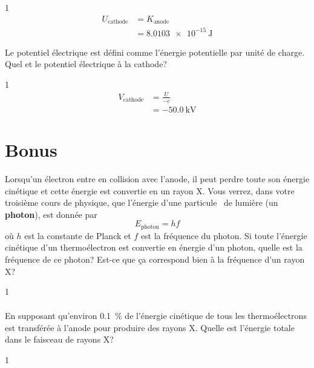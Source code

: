 \documentclass{tufte-handout}
\def\reponse{0}
\begin{document}
\if\reponse1
  {\color{tblue}
    \begin{align*}
      U_\mathrm{cathode} &= K_\mathrm{anode}  \\
        &= \SI{8.0103e-15}{\joule}
    \end{align*}
  }
\else
  \vspace{5cm}
\fi



Le potentiel électrique est défini comme l'énergie potentielle par unité de
charge. Quel et le potentiel électrique à la cathode?

\if\reponse1
  {\color{tblue}
    \begin{align*}
      V_\mathrm{cathode} &= \frac{U}{-e}  \\
        &= \SI{-50.0}{\kilo\volt}
    \end{align*}
  }
\else
  \vspace{5cm}
\fi


\section{Bonus}

\marginnote{
  \[h = \SI{6.626e-34}{\joule\second} \]
}
Lorsqu'un électron entre en collision avec l'anode, il peut perdre toute son
énergie cinétique et cette énergie est convertie en un rayon X. Vous verrez,
dans votre troisième cours de physique, que l'énergie d'une \og particule \fg\
de lumière (un \textbf{photon}), est donnée par
\[E_\mathrm{photon} = hf\]
où $h$ est la constante de Planck et $f$ est la fréquence du photon. Si toute
l'énergie cinétique d'un thermoélectron est convertie en énergie d'un photon,
quelle est la fréquence de ce photon? Est-ce que ça correspond bien à la
fréquence d'un rayon X?

\if\reponse1
  {\color{tblue}
    \begin{align*}
    \end{align*}
  }
\else
  \vspace{3cm}
\fi

En supposant qu'environ \SI{0.1}{\percent} de l'énergie cinétique de tous les
thermoélectrons est transférée à l'anode pour produire des rayons X. Quelle est
l'énergie totale dans le faisceau de rayons X?

\if\reponse1
  {\color{tblue}
    \begin{align*}
    \end{align*}
  }
\else
  \vspace{3cm}
\fi
\end{document}
